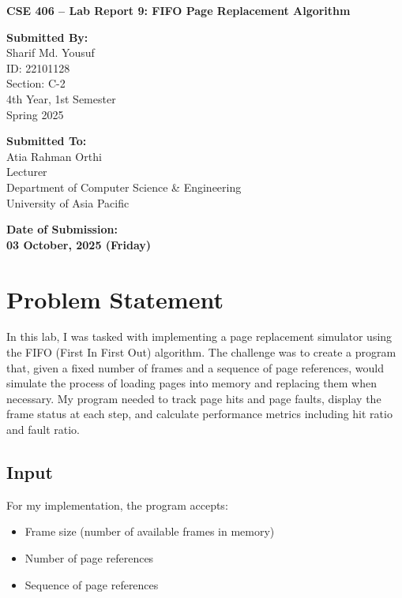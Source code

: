 \documentclass[12pt,a4paper]{article}
\begin{document}
\begin{titlepage}
  \centering
  \vspace*{3cm}

  {\Huge\bfseries CSE 406 – Lab Report 9: FIFO Page Replacement Algorithm \par}
  \vspace{2.5cm}

  \noindent
  \begin{minipage}[t]{0.48\textwidth}
    {\large\bfseries Submitted By:}\\[0.5em]
    \Large
    Sharif Md. Yousuf \\
    ID: 22101128 \\
    Section: C-2 \\
    4th Year, 1st Semester \\
    Spring 2025
  \end{minipage}
  \hfill
  \begin{minipage}[t]{0.48\textwidth}
    {\large\bfseries Submitted To:}\\[0.5em]
    \Large
    Atia Rahman Orthi \\
    Lecturer \\
    Department of Computer Science \& Engineering \\
    University of Asia Pacific
  \end{minipage}

  \vfill

  {\Large\bfseries Date of Submission:} \\[0.5em]
  {\LARGE\bfseries 03 October, 2025 (Friday)}

  \vspace*{2cm}
\end{titlepage}

\section{Problem Statement}
In this lab, I was tasked with implementing a page replacement simulator using the FIFO (First In First Out) algorithm. The challenge was to create a program that, given a fixed number of frames and a sequence of page references, would simulate the process of loading pages into memory and replacing them when necessary. My program needed to track page hits and page faults, display the frame status at each step, and calculate performance metrics including hit ratio and fault ratio.

\subsection*{Input}
For my implementation, the program accepts:
\begin{itemize}
  \item Frame size (number of available frames in memory)
  \item Number of page references
  \item Sequence of page references
\end{itemize}
\end{document}
